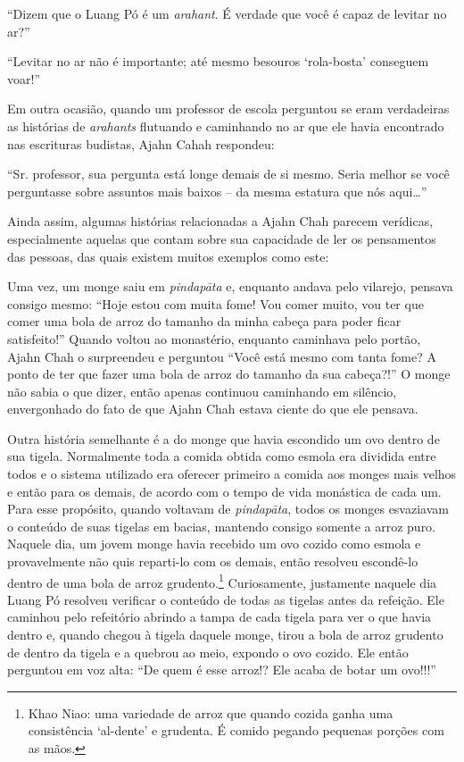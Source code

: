 ``Dizem que o Luang Pó é um \emph{arahant}. É verdade que você é capaz
de levitar no ar?''

``Levitar no ar não é importante; até mesmo besouros `rola-bosta'
conseguem voar!''

Em outra ocasião, quando um professor de escola perguntou se eram
verdadeiras as histórias de \emph{arahants} flutuando e caminhando no ar
que ele havia encontrado nas escrituras budistas, Ajahn Cahah respondeu:

``Sr. professor, sua pergunta está longe demais de si mesmo. Seria
melhor se você perguntasse sobre assuntos mais baixos -- da mesma
estatura que nós aqui\ldots{}''

Ainda assim, algumas histórias relacionadas a Ajahn Chah parecem
verídicas, especialmente aquelas que contam sobre sua capacidade de ler
os pensamentos das pessoas, das quais existem muitos exemplos como este:

Uma vez, um monge saiu em \emph{pindapāta} e, enquanto andava pelo
vilarejo, pensava consigo mesmo: ``Hoje estou com muita fome! Vou comer
muito, vou ter que comer uma bola de arroz do tamanho da minha cabeça
para poder ficar satisfeito!'' Quando voltou ao monastério, enquanto
caminhava pelo portão, Ajahn Chah o surpreendeu e perguntou ``Você está
mesmo com tanta fome? A ponto de ter que fazer uma bola de arroz do
tamanho da sua cabeça?!'' O monge não sabia o que dizer, então apenas
continuou caminhando em silêncio, envergonhado do fato de que Ajahn Chah
estava ciente do que ele pensava.

Outra história semelhante é a do monge que havia escondido um ovo dentro
de sua tigela. Normalmente toda a comida obtida como esmola era dividida
entre todos e o sistema utilizado era oferecer primeiro a comida aos
monges mais velhos e então para os demais, de acordo com o tempo de vida
monástica de cada um. Para esse propósito, quando voltavam de
\emph{pindapāta}, todos os monges esvaziavam o conteúdo de suas tigelas
em bacias, mantendo consigo somente a arroz puro. Naquele dia, um jovem
monge havia recebido um ovo cozido como esmola e provavelmente não quis
reparti-lo com os demais, então resolveu escondê-lo dentro de uma bola
de arroz grudento.\footnote{Khao Niao: uma variedade de arroz que quando
  cozida ganha uma consistência `al-dente' e grudenta. É comido pegando
  pequenas porções com as mãos.} Curiosamente, justamente naquele dia
Luang Pó resolveu verificar o conteúdo de todas as tigelas antes da
refeição. Ele caminhou pelo refeitório abrindo a tampa de cada tigela
para ver o que havia dentro e, quando chegou à tigela daquele monge,
tirou a bola de arroz grudento de dentro da tigela e a quebrou ao meio,
expondo o ovo cozido. Ele então perguntou em voz alta: ``De quem é esse
arroz!? Ele acaba de botar um ovo!!!''

